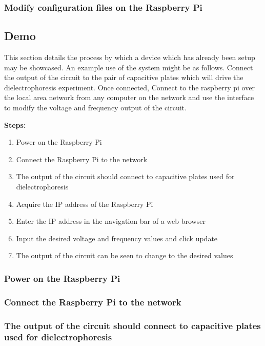 \documentclass{article}	%
\begin{document}
\begin{multicols}{2}
\subsubsection{Modify configuration files on the Raspberry Pi}

\subsection{Demo}
This section details the process
by which a device which has already
been setup may be showcased.
An example use of the system might be as follows.
Connect the output of the circuit to the pair
of capacitive plates which will drive 
the dielectrophoresis experiment.
Once connected,
Connect to the raspberry pi over
the local area network from
any computer on the network and
use the interface to modify the
voltage and frequency output of the circuit.

\textbf{Steps:}
\begin{enumerate}
\item{Power on the Raspberry Pi}
\item{Connect the Raspberry Pi to the network}
\item{The output of the circuit should connect to capacitive plates used for dielectrophoresis}
\item{Acquire the IP address of the Raspberry Pi}
\item{Enter the IP address in the navigation bar of a web browser}
\item{Input the desired voltage and frequency values and click update}
\item{The output of the circuit can be seen to change to the desired values}
\end{enumerate}

\subsubsection{Power on the Raspberry Pi}

\subsubsection{Connect the Raspberry Pi to the network}

\subsubsection{The output of the circuit should connect to capacitive plates used for dielectrophoresis}


\end{multicols}
\end{document}
